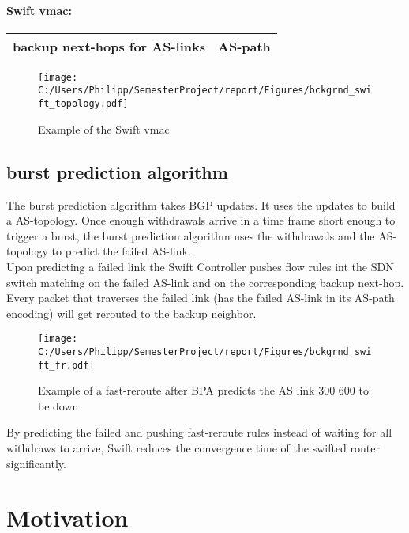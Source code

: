 \paragraph{\label{chapter2:Swift:Swift vmac}Swift vmac:}

\begin{tabular}{|r|l|}
  \hline 
  backup next-hops for AS-links & AS-path \\
  \hline
\end{tabular}


\begin{figure}[h]
\center
\texttt{[image: C:/Users/Philipp/SemesterProject/report/Figures/bckgrnd\_swift\_topology.pdf]}
\caption{Example of the Swift vmac}
\end{figure}


\subsection{\label{chapter2:Swift:burst prediciton algorithm}burst prediction algorithm}
The burst prediction algorithm takes BGP updates. It uses the updates to build a AS-topology. Once enough withdrawals arrive in a time frame short enough to trigger a burst, the burst prediction algorithm uses the withdrawals and the AS-topology to predict the failed AS-link. \\
Upon predicting a failed link the Swift Controller pushes flow rules int the SDN switch matching on the failed AS-link and on the corresponding backup next-hop. \\
Every packet that traverses the failed link (has the failed AS-link in its AS-path encoding) will get rerouted to the backup neighbor.
\begin{figure}[h]
\center
\texttt{[image: C:/Users/Philipp/SemesterProject/report/Figures/bckgrnd\_swift\_fr.pdf]}
\caption{Example of a fast-reroute after BPA predicts the AS link 300 600 to be down}
\end{figure}

By predicting the failed and pushing fast-reroute rules instead of waiting for all withdraws to arrive, Swift reduces the convergence time of the swifted router significantly.


\section{\label{chapter2:Motivation}Motivation}

